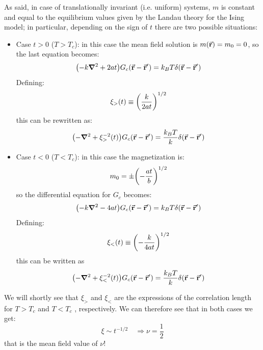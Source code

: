 \documentclass[../main/main.tex]{subfiles}
\begin{document}
As said, in case of translationally invariant (i.e. uniform) systems, \( m \) is constant and equal to the equilibrium values given by the Landau theory for the Ising model; in particular, depending on the sign of \( t \) there are two possible situations:
\begin{itemize}

\item Case \( t>0 \) (\( T > T_c \)): in this case the mean field solution is \( m (\va{r}) = m_0 = 0 \), so the last equation becomes:
\begin{equation}
  \qty(-k \grad ^2 + 2 a t ) G_c (\va{r}-\va{r}') = k_B T \delta (\va{r}-\va{r}')
  \label{eq:17_6}
\end{equation}
Defining:
\begin{equation*}
  \xi_> (t) \equiv  \qty(\frac{k}{2 a t })^{1/2}
\end{equation*}
this can be rewritten as:
\begin{equation*}
  \qty(-\grad ^2 + \xi _> ^{-2} (t)) G_c (\va{r}-\va{r}') = \frac{k_B T}{k} \delta (\va{r}-\va{r}')
\end{equation*}


\item Case \( t<0 \) (\( T < T_c \)): in this case the magnetization is:
\begin{equation*}
  m_0 = \pm \qty(-\frac{at}{b})^{1/2}
\end{equation*}
so the differential equation for \( G_c \) becomes:
\begin{equation}
  \qty(-k \grad ^2 - 4 a t ) G_c (\va{r}-\va{r}') = k_B T \delta (\va{r}-\va{r}')
\end{equation}
Defining:
\begin{equation*}
  \xi _{<} (t) \equiv \qty(- \frac{k}{4at})^{1/2}
\end{equation*}
this can be written as
\begin{equation*}
  \qty(-\grad ^2 + \xi _<^{-2} (t))G_c (\va{r}- \va{r}') = \frac{k_B T}{k} \delta (\va{r}- \va{r}')
\end{equation*}

\end{itemize}

We will shortly see that \( \xi _{>} \)  and \( \xi _{<} \)  are the expressions of the correlation length for \( T>T_c \)  and \( T<T_c \) , respectively. We can therefore see that in both cases we get:
\begin{equation}
  \xi \sim t^{-1/2} \quad \Rightarrow \nu  = \frac{1}{2}
\end{equation}
that is the mean field value of \( \nu  \)!
\end{document}
